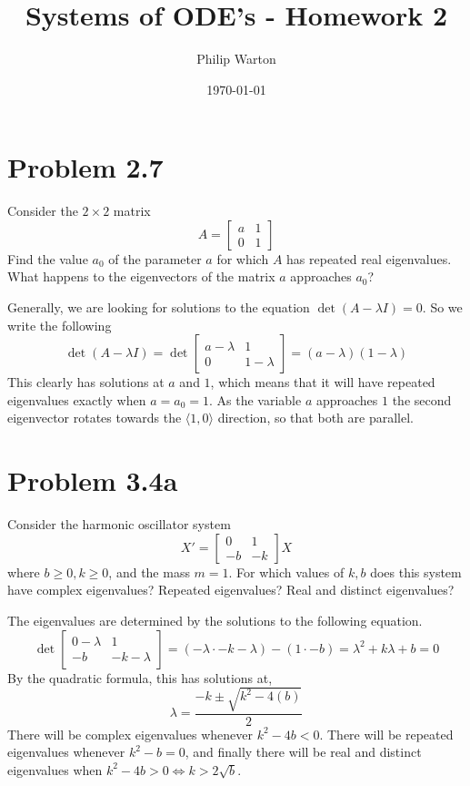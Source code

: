 \documentclass{article}
\theoremstyle{definition}
\begin{document}
\title{Systems of ODE's - Homework 2}
\author{Philip Warton}
\date{\today}
\maketitle
\section*{Problem 2.7}
\begin{mdframed}
    Consider the $2 \times 2$ matrix 
    \[
        A = \begin{bmatrix}
            a&1\\0&1
        \end{bmatrix}
    \]
    Find the value $a_0$ of the parameter $a$ for which $A$
    has repeated real eigenvalues. What happens to the eigenvectors of
    the matrix $a$ approaches $a_0$?
\end{mdframed}
Generally, we are looking for solutions to the equation $\det(A - \lambda I) = 0$.
So we write the following
\[
    \det(A - \lambda I) = \det\begin{bmatrix}
        a - \lambda & 1 \\ 0 & 1 - \lambda
    \end{bmatrix}
    = (a - \lambda)(1 - \lambda)
\]
This clearly has solutions at $a$ and $1$, which means that it will have repeated eigenvalues
exactly when $a = a_0 = 1$. As the variable $a$ approaches $1$ the second eigenvector rotates
towards the $\langle 1, 0 \rangle$ direction, so that both are parallel.
\section*{Problem 3.4a}
\begin{mdframed}
Consider the harmonic oscillator system 
\[
    X' = \begin{bmatrix}
        0&1\\-b&-k
    \end{bmatrix} X
\]
where $b \geqslant 0, k \geqslant 0$, and the mass $m = 1$. For which values of $k,b$ does this system 
have complex eigenvalues? Repeated eigenvalues? Real and distinct eigenvalues?
\end{mdframed}
The eigenvalues are determined by the solutions to the following equation.
\[
    \det \begin{bmatrix} 0-\lambda&1\\-b&-k-\lambda \end{bmatrix} = (-\lambda \cdot -k-\lambda) - (1 \cdot -b) = \lambda^2 +k\lambda + b = 0
\]
By the quadratic formula, this has solutions at,
\[
    \lambda = \frac{-k \pm \sqrt{k^2 - 4(b)}}{2}
\]
There will be complex eigenvalues whenever $k^2 - 4b < 0$. There will be repeated eigenvalues whenever $k^2 - b = 0$, and
finally there will be real and distinct eigenvalues when $k^2 - 4b > 0 \Longleftrightarrow k > 2 \sqrt{b}$.
\end{document}
